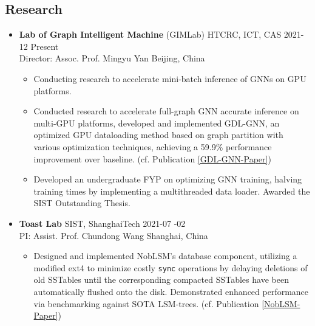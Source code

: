 \documentclass[a4paper,10pt]{ctexart} %
\begin{document}
\begin{keepsection}
\subsection{Research}
\begin{itemize}
    \item \textbf{Lab of Graph Intelligent Machine} (GIMLab) \quad HTCRC, ICT, CAS \hfill 2021-12 \datetlide Present \\
    {\small Director: Assoc. Prof. Mingyu Yan} \hfill Beijing, China
    \begin{small}
        \begin{itemize}
            \item Conducting research to accelerate mini-batch inference of GNNs on GPU platforms.
            \item Conducted research to accelerate full-graph GNN accurate inference on multi-GPU platforms, developed and implemented GDL-GNN, an optimized GPU dataloading method based on graph partition with various optimization techniques, achieving a 59.9\% performance improvement over baseline. (cf. Publication \ref{GDL-GNN-Paper})
            \item Developed an undergraduate FYP on optimizing GNN training, halving training times by implementing a multithreaded data loader. Awarded the SIST Outstanding Thesis.
        \end{itemize}
    \end{small}

    \item \textbf{Toast Lab} \quad SIST, ShanghaiTech \hfill 2021-07 -02 \\
    {\small PI: Assist. Prof. Chundong Wang} \hfill Shanghai, China
    \begin{small}
        \begin{itemize}
            \item Designed and implemented NobLSM's database component, utilizing a modified ext4 to minimize costly \texttt{sync} operations by delaying deletions of old SSTables until the corresponding compacted SSTables have been automatically flushed onto the disk. Demonstrated enhanced performance via benchmarking against SOTA LSM-trees. (cf. Publication \ref{NobLSM-Paper})
        \end{itemize}
    \end{small}


\end{itemize}
\end{keepsection}
\end{document}
